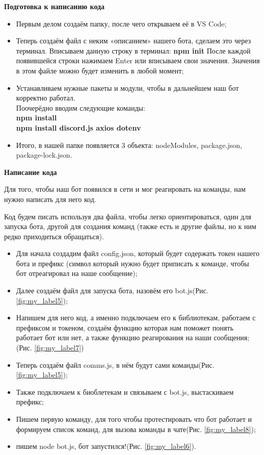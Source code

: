 \documentclass[a4paper,12pt]{article}
\begin{document}
\begin{center}
\textbf{Подготовка к написанию кода}
\end{center}
\begin{itemize}
    \item Первым делом создаём папку, после чего открываем её в VS Code;
    \item Теперь создаём файл с неким «описанием» нашего бота, сделаем это через терминал.
    Вписываем данную строку в терминал: \textbf{npm init}
    После каждой появившейся строки нажимаем Enter или вписываем свои значения.
    Значения в этом файле можно будет изменить в любой момент;
    \item Устанавливаем нужные пакеты и модули, чтобы в дальнейшем наш бот корректно работал. \\
    Поочерёдно вводим следующие команды: \textbf{ \\npm install \\ npm install discord.js axios dotenv}
    \item Итого, в нашей папке появляется 3 объекта: nodeModules, package.json, package-lock.json.
\end{itemize}

\newpage
\begin{center}
\textbf{Написание кода}
\end{center}

Для того, чтобы наш бот появился в сети и мог реагировать на команды, нам нужно написать для него код.

Код будем писать используя два файла, чтобы легко ориентироваться, один для запуска бота, другой для создания команд (также есть и другие файлы, но к ним редко приходиться обращаться).

\begin{itemize}
    \item Для начала создадим файл config.json, который будет содержать токен нашего бота и префикс (символ который нужно будет приписать к команде, чтобы бот отреагировал на наше сообщение);
    \item Далее создаём файл для запуска бота, назовём его bot.js({Рис. \ref{fig:my_label5}});
    \item Напишем для него код, а именно подключаем его к библиотекам, работаем с префиксом и токеном, создаём функцию которая нам поможет понять работает бот или нет, а также функцию реагирования на наши сообщения;({Рис. \ref{fig:my_label7}})
    \item Теперь создаём файл comms.js, в нём будут сами команды({Рис. \ref{fig:my_label5}});
    \item Также подключаем к биоблетекам и связываем с bot.js, выстаскиваем префикс;
    \item Пишем первую команду, для того чтобы протестировать что бот работает и формируем список команд, для вызова команды в чате({Рис. \ref{fig:my_label8}});
    \item пишем node bot.js, бот запустился!({Рис. \ref{fig:my_label6}}).
\end{itemize}
\end{document}
